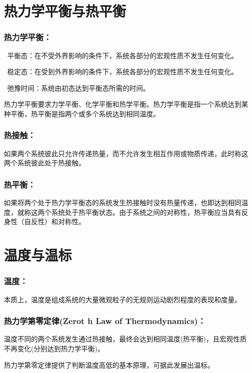 \documentclass[zihao=-4,UTF8]{report}
\begin{document}
\section{热力学平衡与热平衡}
\subsubsection{热力学平衡：}
\ 平衡态：在不受外界影响的条件下，系统各部分的宏观性质不发生任何变化。\par
{}\ 稳定态：在受到外界影响的条件下，系统各部分的宏观性质不发生任何变化。\par
{}\ 弛豫时间：系统由初态达到平衡态所需的时间。\par
{\color{gray}\small 热力学平衡要求力学平衡、化学平衡和热学平衡。热力学平衡是指一个系统达到某种平衡，热平衡是指两个或多个系统达到相同温度。}
\subsubsection{热接触：}
如果两个系统彼此只允许传递热量，而不允许发生相互作用或物质传递，此时称这两个系统彼此处于热接触。
\subsubsection{热平衡：}
如果将两个处于热力学平衡态的系统发生热接触时没有热量传递，也即达到相同温度，就称这两个系统处于热平衡状态。{\color{gray}\small 由于系统之间的对称性，热平衡应当具有反身性（自反性）和对称性。}

\section{温度与温标}
\subsubsection{温度：}
本质上，温度是组成系统的大量微观粒子的无规则运动剧烈程度的表现和度量。
\subsubsection{热力学第零定律(Zerot h Law of Thermodynamics)：}
温度不同的两个系统发生通过热接触，最终会达到相同温度(热平衡)，且宏观性质不再变化(分别达到热力学平衡)。\par
{\color{gray}\small 热力学第零定律提供了判断温度高低的基本原理，可据此发展出温标。}
\end{document}
